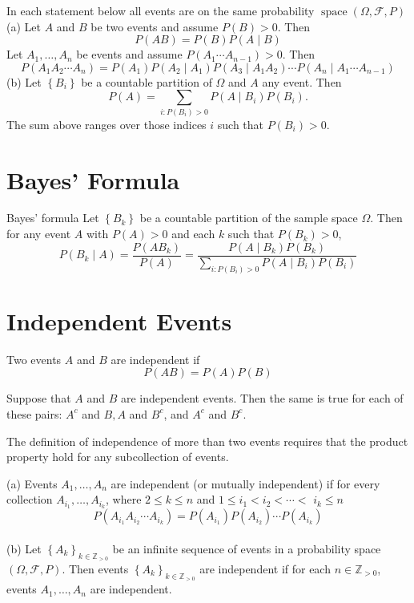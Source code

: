 \documentclass[11pt]{elegantbook}
\begin{document}
\begin{theorem}
In each statement below all events are on the same probability $\operatorname{space}(\Omega, \mathcal{F}, P)$\\
(a) Let $A$ and $B$ be two events and assume $P(B)>0$. Then
$$
P(A B)=P(B) P(A \mid B)
$$
Let $A_1, \ldots, A_n$ be events and assume $P\left(A_1 \cdots A_{n-1}\right)>0$. Then
$$
P\left(A_1 A_2 \cdots A_n\right)=P\left(A_1\right) P\left(A_2 \mid A_1\right) P\left(A_3 \mid A_1 A_2\right) \cdots P\left(A_n \mid A_1 \cdots A_{n-1}\right)
$$
(b) Let $\left\{B_i\right\}$ be a countable partition of $\Omega$ and $A$ any event. Then
$$
P(A)=\sum_{i: P\left(B_i\right)>0} P\left(A \mid B_i\right) P\left(B_i\right) .
$$
The sum above ranges over those indices $i$ such that $P\left(B_i\right)>0$.
\end{theorem}

\section{Bayes' Formula}

\begin{theorem}{Bayes' formula}
Let $\left\{B_k\right\}$ be a countable partition of the sample space $\Omega$. Then for any event $A$ with $P(A)>0$ and each $k$ such that $P\left(B_k\right)>0$,
$$
P\left(B_k \mid A\right)=\frac{P\left(A B_k\right)}{P(A)}=\frac{P\left(A \mid B_k\right) P\left(B_k\right)}{\sum_{i: P\left(B_i\right)>0} P\left(A \mid B_i\right) P\left(B_i\right)}
$$
\end{theorem}

\section{Independent Events}

\begin{definition}
    Two events $A$ and $B$ are independent if
$$
P(A B)=P(A) P(B)
$$
\end{definition}

\begin{theorem}
Suppose that $A$ and $B$ are independent events. Then the same is true for each of these pairs: $A^c$ and $B, A$ and $B^c$, and $A^c$ and $B^c$.
\end{theorem}

The definition of independence of more than two events requires that the product property hold for any subcollection of events.

\begin{definition}
(a) Events $A_1, \ldots, A_n$ are independent (or mutually independent) if for every collection $A_{i_1}, \ldots, A_{i_k}$, where $2 \leq k \leq n$ and $1 \leq i_1<i_2<\cdots<$ $i_k \leq n$
$$
P\left(A_{i_1} A_{i_2} \cdots A_{i_k}\right)=P\left(A_{i_1}\right) P\left(A_{i_2}\right) \cdots P\left(A_{i_k}\right)
$$\\
(b) Let $\left\{A_k\right\}_{k \in \mathbb{Z}_{>0}}$ be an infinite sequence of events in a probability space $(\Omega, \mathcal{F}, P)$. Then events $\left\{A_k\right\}_{k \in \mathbb{Z}_{>0}}$ are independent if for each $n \in \mathbb{Z}_{>0}$, events $A_1, \ldots, A_n$ are independent.
\end{definition}
\end{document}
